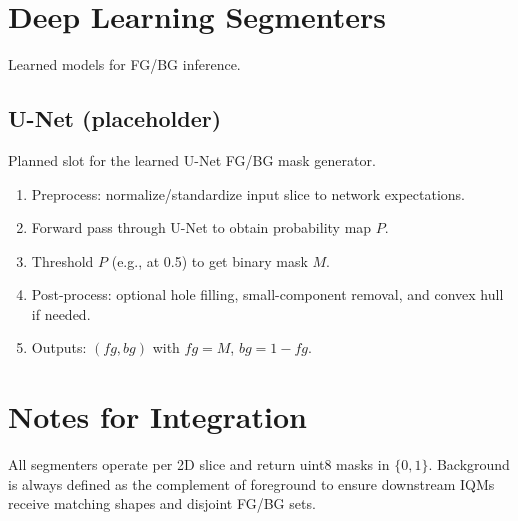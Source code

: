 \documentclass[11pt]{AmirGitDoc}
\begin{document}
\section{Deep Learning Segmenters}
Learned models for FG/BG inference.

\subsection{U-Net (placeholder)}
Planned slot for the learned U-Net FG/BG mask generator.
\begin{AmirAlgo}
\begin{enumerate}
    \item Preprocess: normalize/standardize input slice to network expectations.
    \item Forward pass through U-Net to obtain probability map $P$.
    \item Threshold $P$ (e.g., at 0.5) to get binary mask $M$.
    \item Post-process: optional hole filling, small-component removal, and convex hull if needed.
    \item Outputs: $(fg, bg)$ with $fg = M$, $bg = 1 - fg$.
\end{enumerate}
\end{AmirAlgo}

\section{Notes for Integration}
All segmenters operate per 2D slice and return uint8 masks in $\{0,1\}$. Background is always defined as the complement of foreground to ensure downstream IQMs receive matching shapes and disjoint FG/BG sets.


\printbibliography[heading=bibintoc,title={References}]
\end{document}

